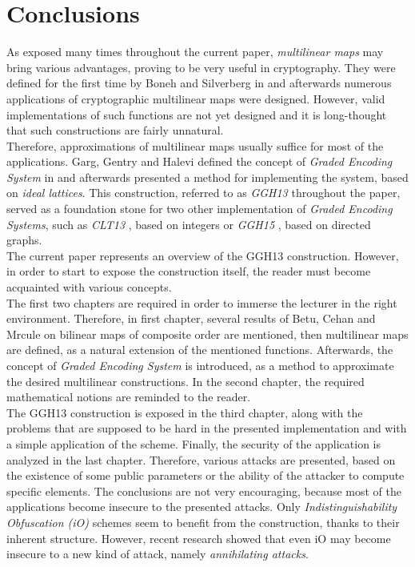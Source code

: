 \chapter*{Conclusions}

As exposed many times throughout the current paper, \textit{multilinear maps} may bring various advantages, proving to be very useful in cryptography. They were defined for the first time by Boneh and Silverberg in \cite{BoS02} and afterwards numerous applications of cryptographic multilinear maps were designed. However, valid implementations of such functions are not yet designed and it is long-thought that such constructions are fairly unnatural.\\

Therefore, approximations of multilinear maps usually suffice for most of the applications. Garg, Gentry and Halevi defined the concept of \textit{Graded Encoding System} in \cite{GGH13} and afterwards presented a method for implementing the system, based on \textit{ideal lattices}. This construction, referred to as \textit{GGH13} throughout the paper, served as a foundation stone for two other implementation of \textit{Graded Encoding Systems}, such as \textit{CLT13} \cite{CLT13}, based on integers or \textit{GGH15} \cite{GGH15}, based on directed graphs. \\

The current paper represents an overview of the GGH13 construction. However, in order to start to expose the construction itself, the reader must become acquainted with various concepts.\\

The first two chapters are required in order to immerse the lecturer in the right environment. Therefore, in first chapter, several results of B{\ua}etu, Cehan and M{\ua}rcule{\tz} \cite{BCM16} on bilinear maps of composite order are mentioned, then multilinear maps are defined, as a natural extension of the mentioned functions. Afterwards, the concept of \textit{Graded Encoding System} is introduced, as a method to approximate the desired multilinear constructions. In the second chapter, the required mathematical notions are reminded to the reader.\\

The GGH13 construction is exposed in the third chapter, along with the problems that are supposed to be hard in the presented implementation and with a simple application of the scheme. Finally, the security of the application is analyzed in the last chapter. Therefore, various attacks are presented, based on the existence of some public parameters or the ability of the attacker to compute specific elements. The conclusions are not very encouraging, because most of the applications become insecure to the presented attacks. Only \textit{Indistinguishability Obfuscation (iO)} schemes seem to benefit from the construction, thanks to their inherent structure. However, recent research \cite{MSZ16} showed that even iO may become insecure to a new kind of attack, namely \textit{annihilating attacks}.\\

